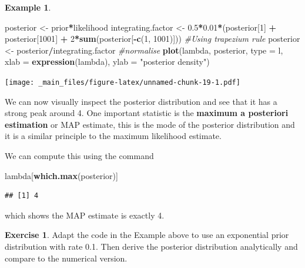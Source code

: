 \documentclass[
]{book}
\newenvironment{Shaded}{\begin{snugshade}}{\end{snugshade}}
\newcommand{\AttributeTok}[1]{\textcolor[rgb]{0.13,0.29,0.53}{#1}}
\newcommand{\CommentTok}[1]{\textcolor[rgb]{0.56,0.35,0.01}{\textit{#1}}}
\newcommand{\DecValTok}[1]{\textcolor[rgb]{0.00,0.00,0.81}{#1}}
\newcommand{\FloatTok}[1]{\textcolor[rgb]{0.00,0.00,0.81}{#1}}
\newcommand{\FunctionTok}[1]{\textcolor[rgb]{0.13,0.29,0.53}{\textbf{#1}}}
\newcommand{\NormalTok}[1]{#1}
\newcommand{\OtherTok}[1]{\textcolor[rgb]{0.56,0.35,0.01}{#1}}
\newcommand{\SpecialCharTok}[1]{\textcolor[rgb]{0.81,0.36,0.00}{\textbf{#1}}}
\newcommand{\StringTok}[1]{\textcolor[rgb]{0.31,0.60,0.02}{#1}}
\theoremstyle{definition}
\theoremstyle{definition}
\newtheorem{example}{Example}[chapter]
\theoremstyle{definition}
\newtheorem{exercise}{Exercise}[chapter]
\theoremstyle{definition}
\theoremstyle{remark}
\begin{document}
\begin{example}
\begin{Shaded}
\begin{Highlighting}[]
\NormalTok{posterior }\OtherTok{\textless{}{-}}\NormalTok{ prior}\SpecialCharTok{*}\NormalTok{likelihood}
\NormalTok{integrating.factor }\OtherTok{\textless{}{-}} \FloatTok{0.5}\SpecialCharTok{*}\FloatTok{0.01}\SpecialCharTok{*}\NormalTok{(posterior[}\DecValTok{1}\NormalTok{] }\SpecialCharTok{+}\NormalTok{ posterior[}\DecValTok{1001}\NormalTok{] }\SpecialCharTok{+} \DecValTok{2}\SpecialCharTok{*}\FunctionTok{sum}\NormalTok{(posterior[}\SpecialCharTok{{-}}\FunctionTok{c}\NormalTok{(}\DecValTok{1}\NormalTok{, }\DecValTok{1001}\NormalTok{)])) }\CommentTok{\#Using trapezium rule}
\NormalTok{posterior }\OtherTok{\textless{}{-}}\NormalTok{ posterior}\SpecialCharTok{/}\NormalTok{integrating.factor }\CommentTok{\#normalise}
\FunctionTok{plot}\NormalTok{(lambda, posterior, }\AttributeTok{type =} \StringTok{\textquotesingle{}l\textquotesingle{}}\NormalTok{, }\AttributeTok{xlab =} \FunctionTok{expression}\NormalTok{(lambda), }
     \AttributeTok{ylab =} \StringTok{"posterior density"}\NormalTok{)}
\end{Highlighting}
\end{Shaded}

\texttt{[image: \_main\_files/figure-latex/unnamed-chunk-19-1.pdf]}

We can now visually inspect the posterior distribution and see that it has a strong peak around 4. One important statistic is the \textbf{maximum a posteriori estimation} or MAP estimate, this is the mode of the posterior distribution and it is a similar principle to the maximum likelihood estimate.

We can compute this using the command

\begin{Shaded}
\begin{Highlighting}[]
\NormalTok{lambda[}\FunctionTok{which.max}\NormalTok{(posterior)]}
\end{Highlighting}
\end{Shaded}

\begin{verbatim}
## [1] 4
\end{verbatim}

which shows the MAP estimate is exactly 4.
\end{example}

\begin{exercise}
Adapt the code in the Example above to use an exponential prior distribution with rate 0.1. Then derive the posterior distribution analytically and compare to the numerical version.
\end{exercise}
\end{document}
